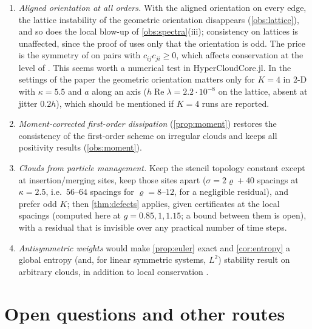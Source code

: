 \documentclass[11pt,a4paper]{article}
\theoremstyle{plain}
\theoremstyle{definition}
\theoremstyle{remark}
\numberwithin{equation}{section}
\renewcommand{\Re}{\operatorname{Re}}
\newcommand{\A}[1]{\cite[#1]{Addendum}}
\begin{document}
\begin{enumerate}[label=(\arabic*)]
\item \emph{Aligned orientation at all orders.} With the aligned orientation on every edge, the lattice instability of the geometric orientation disappears (\cref{obs:lattice}), and so does the local blow-up of \cref{obs:spectra}(iii); consistency on lattices is unaffected, since the proof of \A{Prop.~4.3} uses only that the orientation is odd. The price is the symmetry of \A{Lem.~4.1} on pairs with $c_{ij}c_{ji}\ge0$, which affects conservation at the level of \A{Prop.~4.4(ii)}. This seems worth a numerical test in HyperCloudCore.jl. In the settings of the paper the geometric orientation matters only for $K=4$ in 2-D with $\kappa=5.5$ and $a$ along an axis ($h\Re\lambda=2.2\cdot10^{-8}$ on the lattice, absent at jitter $0.2h$), which should be mentioned if $K=4$ runs are reported.
\item \emph{Moment-corrected first-order dissipation} (\cref{prop:moment}) restores the consistency of the first-order scheme on irregular clouds and keeps all positivity results (\cref{obs:moment}).
\item \emph{Clouds from particle management.} Keep the stencil topology constant except at insertion/merging sites, keep those sites apart ($\sigma=2\varrho+40$ spacings at $\kappa=2.5$, i.e.\ $56$--$64$ spacings for $\varrho=8$--$12$, for a negligible residual), and prefer odd $K$; then \cref{thm:defects} applies, given certificates at the local spacings (computed here at $g=0.85,1,1.15$; a bound between them is open), with a residual that is invisible over any practical number of time steps.
\item \emph{Antisymmetric weights} would make \cref{prop:euler} exact and \cref{cor:entropy} a global entropy (and, for linear symmetric systems, $L^2$) stability result on arbitrary clouds, in addition to local conservation \A{Prop.~4.4}.
\end{enumerate}

\section{Open questions and other routes}\label{sec:open}
\end{document}

